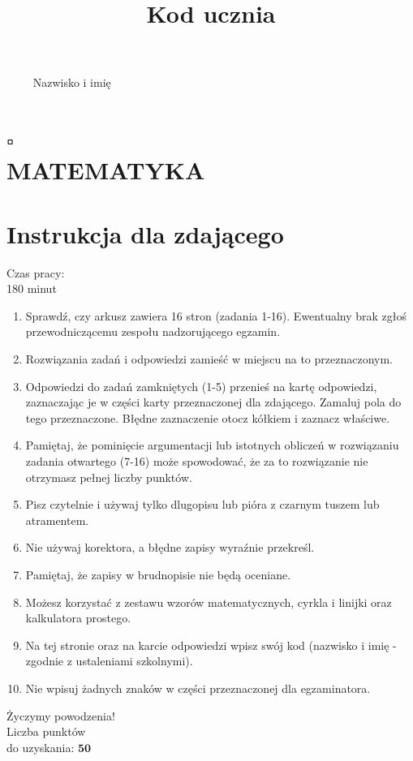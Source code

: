 \documentclass[10pt]{article}
\title{Kod ucznia }
\author{}
\date{}
\begin{document}
\maketitle
\(\qquad\) Nazwisko i imię \(\qquad\)

\section*{\(\square\) \\
 MATEMATYKA}
\section*{Instrukcja dla zdającego}
Czas pracy:\\
180 minut

\begin{enumerate}
  \item Sprawdź, czy arkusz zawiera 16 stron (zadania 1-16). Ewentualny brak zgłoś przewodniczącemu zespołu nadzorującego egzamin.
  \item Rozwiązania zadań i odpowiedzi zamieść w miejscu na to przeznaczonym.
  \item Odpowiedzi do zadań zamkniętych (1-5) przenieś na kartę odpowiedzi, zaznaczając je w części karty przeznaczonej dla zdającego. Zamaluj pola do tego przeznaczone. Błędne zaznaczenie otocz kółkiem i zaznacz właściwe.
  \item Pamiętaj, że pominięcie argumentacji lub istotnych obliczeń w rozwiązaniu zadania otwartego (7-16) może spowodować, że za to rozwiązanie nie otrzymasz pełnej liczby punktów.
  \item Pisz czytelnie i używaj tylko dlugopisu lub pióra z czarnym tuszem lub atramentem.
  \item Nie używaj korektora, a błędne zapisy wyraźnie przekreśl.
  \item Pamiętaj, że zapisy w brudnopisie nie będą oceniane.
  \item Możesz korzystać z zestawu wzorów matematycznych, cyrkla i linijki oraz kalkulatora prostego.
  \item Na tej stronie oraz na karcie odpowiedzi wpisz swój kod (nazwisko i imię - zgodnie z ustaleniami szkolnymi).
  \item Nie wpisuj żadnych znaków w części przeznaczonej dla egzaminatora.
\end{enumerate}

Życzymy powodzenia!\\
Liczba punktów\\
do uzyskania: \(\mathbf{5 0}\)
\end{document}
